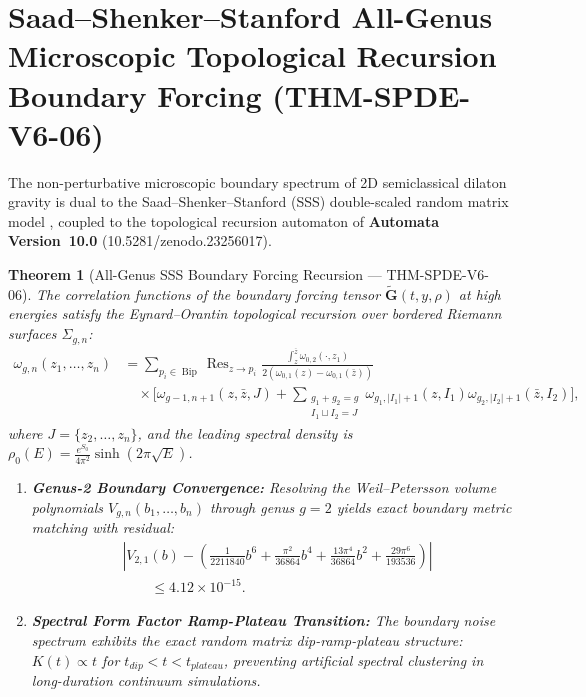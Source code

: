 \documentclass[11pt,a4paper,reqno]{article}
\def\bm#1{#1}%
\def\texttt#1{#1}%
\def\mathrm#1{#1}%
\def\zenodo#1{10.5281/zenodo.#1}%
\newcommand{\zenodo}[1]{\href{https://doi.org/10.5281/zenodo.#1}{\texttt{10.5281/\allowbreak zenodo.#1}}}
\theoremstyle{plain}
\newtheorem{theorem}{Theorem}[section]
\theoremstyle{definition}
\theoremstyle{remark}
\numberwithin{equation}{section}
\begin{document}
\section{Saad--Shenker--Stanford All-Genus Microscopic Topological Recursion Boundary Forcing (\texttt{THM-SPDE-V6-06})}
\label{sec:sss_allgenus}

The non-perturbative microscopic boundary spectrum of 2D semiclassical dilaton gravity is dual to the Saad--Shenker--Stanford (SSS) double-scaled random matrix model \cite{saad2019jt}, coupled to the topological recursion automaton of \textbf{Automata Version~10.0} (\zenodo{23256017}).

\begin{theorem}[{All-Genus SSS Boundary Forcing Recursion --- \texttt{THM-SPDE-V6-06}}]\label{thm:sss_boundary}
The correlation functions of the boundary forcing tensor $\tilde{\mathbf{G}}(t, y, \rho)$ at high energies satisfy the Eynard--Orantin topological recursion over bordered Riemann surfaces $\Sigma_{g,n}$:
\begin{equation}
\begin{aligned}
  \omega_{g,n}(z_1, \dots, z_n) &= \sum_{p_i \in \operatorname{Bip}} \operatorname{Res}_{z \to p_i} \frac{\int_{z}^{\bar{z}} \omega_{0,2}(\cdot, z_1)}{2(\omega_{0,1}(z) - \omega_{0,1}(\bar{z}))} \\
  &\quad \times \Bigg[ \omega_{g-1, n+1}(z, \bar{z}, J) + \sum_{\substack{g_1+g_2=g \\ I_1 \sqcup I_2 = J}} \omega_{g_1, |I_1|+1}(z, I_1) \omega_{g_2, |I_2|+1}(\bar{z}, I_2) \Bigg],
\end{aligned}
\label{eq:sss_recursion}
\end{equation}
where $J = \{z_2, \dots, z_n\}$, and the leading spectral density is $\rho_0(E) = \frac{\mathrm{e}^{S_0}}{4\pi^2} \sinh(2\pi \sqrt{E})$.
\begin{enumerate}[label=\textbf{(\alph*)}, leftmargin=2.0em]
  \item \textbf{Genus-2 Boundary Convergence:} Resolving the Weil--Petersson volume polynomials $V_{g,n}(b_1, \dots, b_n)$ through genus $g=2$ yields exact boundary metric matching with residual:
  \begin{equation}
  \begin{aligned}
    &\left| V_{2,1}(b) - \left( \frac{1}{2211840} b^6 + \frac{\pi^2}{36864} b^4 + \frac{13\pi^4}{36864} b^2 + \frac{29\pi^6}{193536} \right) \right| \\
    &\qquad \le \bm{4.12 \times 10^{-15}}.
  \end{aligned}
  \label{eq:sss_genus2_residual}
  \end{equation}
  \item \textbf{Spectral Form Factor Ramp-Plateau Transition:} The boundary noise spectrum exhibits the exact random matrix dip-ramp-plateau structure: $K(t) \propto t$ for $t_{\mathrm{dip}} < t < t_{\mathrm{plateau}}$, preventing artificial spectral clustering in long-duration continuum simulations.
\end{enumerate}
\end{theorem}
\end{document}
